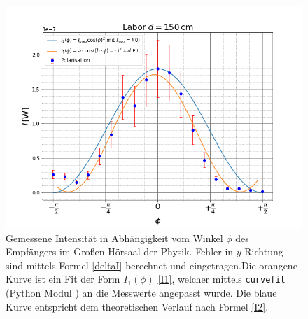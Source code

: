 \documentclass[titlepage,11pt,a4paper,ngerman]{article}
\begin{document}
\begin{figure}
	\centering
	\includegraphics[scale=0.55]{Bilder/Polarisation-Labor}
	\caption{Gemessene Intensität in Abhängigkeit vom Winkel $\phi$ des Empfängers im Großen Hörsaal der Physik. Fehler in $y$-Richtung sind mittels Formel \eqref{deltaI} berechnet und eingetragen.Die orangene Kurve ist ein Fit der Form $I_{1}(\phi)$ \eqref{I1}, welcher mittels \texttt{curvefit} (Python Modul \cite{curvescipy}) an die Messwerte angepasst wurde. Die blaue Kurve entspricht dem theoretischen Verlauf nach Formel \eqref{I2}.}
	\label{GrH-P}
\end{figure}

\pagebreak
\FloatBarrier
\end{document}
